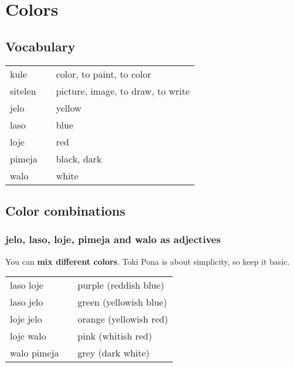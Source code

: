\section{Colors}
%
\subsection*{Vocabulary}
%
\begin{supertabular}{p{5,5cm}|ll}
kule && color, to paint, to color \\                
sitelen && picture, image, to draw, to write \\
jelo && yellow \\
laso && blue \\
loje && red \\
pimeja && black, dark \\
walo && white \\
\end{supertabular} 
%
\subsection*{Color combinations}
\subsubsection*{jelo, laso, loje, pimeja and walo as adjectives}

%
You can \textbf{mix different colors}. 
Toki Pona is about simplicity, so keep it basic. 

\begin{supertabular}{p{5,5cm}|ll}
laso loje && purple (reddish blue) \\
laso jelo && green (yellowish blue) \\
loje jelo && orange (yellowish red) \\
loje walo && pink (whitish red) \\
walo pimeja && grey (dark white) \\
\end{supertabular} 

